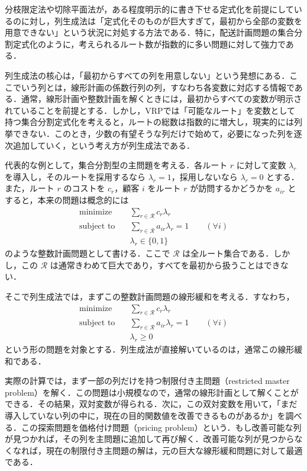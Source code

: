 分枝限定法や切除平面法が，ある程度明示的に書き下せる定式化を前提にしているのに対し，列生成法は「定式化そのものが巨大すぎて，最初から全部の変数を用意できない」という状況に対処する方法である\cite{VANDERBECK2006296}．特に，配送計画問題の集合分割定式化のように，考えられるルート数が指数的に多い問題に対して強力である．

列生成法の核心は，「最初からすべての列を用意しない」という発想にある．ここでいう列とは，線形計画の係数行列の列，すなわち各変数に対応する情報である．通常，線形計画や整数計画を解くときには，最初からすべての変数が明示されていることを前提とする．しかし，VRPでは「可能なルート」を変数として持つ集合分割定式化を考えると，ルートの総数は指数的に増大し，現実的には列挙できない．このとき，少数の有望そうな列だけで始めて，必要になった列を逐次追加していく，という考え方が列生成法である．

代表的な例として，集合分割型の主問題を考える．各ルート $r$ に対して変数 $\lambda_r$ を導入し，そのルートを採用するなら $\lambda_r=1$，採用しないなら $\lambda_r=0$ とする．また，ルート $r$ のコストを $c_r$，顧客 $i$ をルート $r$ が訪問するかどうかを $a_{ir}$ とすると，本来の問題は概念的には
\begin{align}
\text{minimize}\quad & \sum_{r\in\mathcal{R}} c_r\lambda_r\\
\text{subject to}\quad & \sum_{r\in\mathcal{R}} a_{ir}\lambda_r = 1 \qquad (\forall i)\\
& \lambda_r \in \{0,1\}
\end{align}
のような整数計画問題として書ける．ここで $\mathcal{R}$ は全ルート集合である．しかし，この $\mathcal{R}$ は通常きわめて巨大であり，すべてを最初から扱うことはできない．

そこで列生成法では，まずこの整数計画問題の線形緩和を考える．すなわち，
\begin{align}
\text{minimize}\quad & \sum_{r\in\mathcal{R}} c_r\lambda_r\\
\text{subject to}\quad & \sum_{r\in\mathcal{R}} a_{ir}\lambda_r = 1 \qquad (\forall i)\\
& \lambda_r \ge 0
\end{align}
という形の問題を対象とする．列生成法が直接解いているのは，通常この線形緩和である．

実際の計算では，まず一部の列だけを持つ制限付き主問題（restricted master problem）を解く．この問題は小規模なので，通常の線形計画として解くことができる．その結果，双対変数が得られる．次に，この双対変数を用いて，「まだ導入していない列の中に，現在の目的関数値を改善できるものがあるか」を調べる．この探索問題を価格付け問題（pricing problem）という．もし改善可能な列が見つかれば，その列を主問題に追加して再び解く．改善可能な列が見つからなくなれば，現在の制限付き主問題の解は，元の巨大な線形緩和問題に対して最適である．

